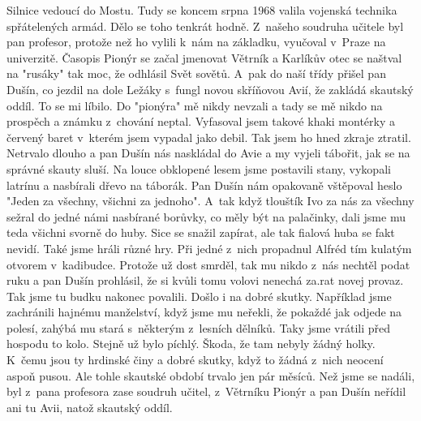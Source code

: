 
Silnice vedoucí do Mostu. Tudy se koncem srpna 1968 valila vojenská
technika spřátelených armád. Dělo se toho tenkrát hodně. Z~našeho
soudruha učitele byl pan profesor, protože než ho vylili k~nám na
základku, vyučoval v~Praze na univerzitě. Časopis Pionýr se začal
jmenovat Větrník a Karlíkův otec se naštval na "rusáky" tak moc, že
odhlásil Svět sovětů. A~pak do naší třídy přišel pan Dušín, co jezdil
na dole Ležáky s~fungl novou skříňovou Avií, že zakládá skautský
oddíl. To se mi líbilo. Do "pionýra" mě nikdy nevzali a tady se mě
nikdo na prospěch a známku z~chování neptal. Vyfasoval jsem takové
khaki montérky a červený baret v~kterém jsem vypadal jako debil. Tak
jsem ho hned zkraje ztratil. Netrvalo dlouho a pan Dušín nás naskládal
do Avie a my vyjeli tábořit, jak se na správné skauty sluší. Na louce
    obklopené lesem jsme postavili stany, vykopali latrínu a nasbírali
    dřevo na táborák. Pan Dušín nám opakovaně vštěpoval heslo "Jeden
    za všechny, všichni za jednoho". A~tak když tlouštík Ivo za nás za
    všechny sežral do jedné námi nasbírané borůvky, co měly být na
    palačinky, dali jsme mu teda všichni svorně do huby. Sice se
    snažil zapírat, ale tak fialová huba se fakt nevidí. Také jsme
    hráli různé hry. Při jedné z~nich propadnul Alfréd tím kulatým
    otvorem v~kadibudce. Protože už dost smrděl, tak mu nikdo z~nás
    nechtěl podat ruku a pan Dušín prohlásil, že si kvůli tomu volovi
    nenechá za.rat novej provaz. Tak jsme tu budku nakonec povalili.
    Došlo i na dobré skutky. Například jsme zachránili hajnému
    manželství, když jsme mu neřekli, že pokaždé jak odjede na polesí,
    zahýbá mu stará s~některým z~lesních dělníků. Taky jsme vrátili
    před hospodu to kolo. Stejně už bylo píchlý. Škoda, že tam nebyly
    žádný holky. K~čemu jsou ty hrdinské činy a dobré skutky, když to
    žádná z~nich neocení aspoň pusou. Ale tohle skautské období trvalo
    jen pár měsíců. Než jsme se nadáli, byl z~pana profesora zase
    soudruh učitel, z~Větrníku Pionýr a pan Dušín neřídil ani tu Avii,
    natož skautský oddíl.

